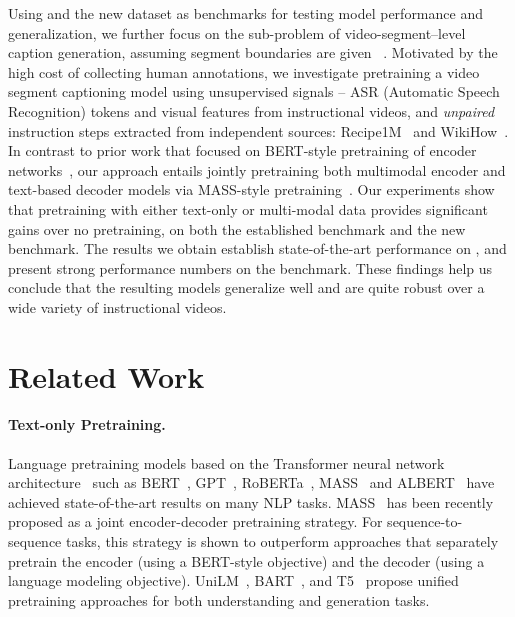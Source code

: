 \documentclass[11pt,a4paper]{article}
\begin{document}
Using \youcook and the new \ldvm dataset as benchmarks for testing model performance and generalization, we further focus on the sub-problem of video-segment--level caption generation, assuming segment boundaries are given ~\cite{hessel2019case,sun2019videobert,luo2020univilm}.
Motivated by the high cost of collecting human annotations, we investigate pretraining a video segment captioning model using unsupervised signals -- ASR (Automatic Speech Recognition) tokens and visual features from instructional videos, and {\em unpaired} instruction steps extracted from independent sources: Recipe1M~\cite{marin2019recipe1m+} and WikiHow~\cite{koupaee2018wikihow}.
In contrast to prior work that focused on BERT-style pretraining of encoder networks~\citep{sun2019videobert, sun2019contrastive},
our approach entails jointly pretraining both multimodal encoder and text-based decoder models via MASS-style pretraining~\cite{song2019mass}.
Our experiments show that pretraining with either text-only or multi-modal data provides significant gains over no pretraining, on both the established \youcook benchmark and the new \ldvm benchmark.
The results we obtain establish state-of-the-art performance on \youcook, and present strong performance numbers on the \ldvm benchmark.
These findings help us conclude that the resulting models generalize well and are quite robust over a wide variety of instructional videos.













\section{Related Work}
\label{sec:relwork}



\paragraph{Text-only Pretraining.} 
Language pretraining models based on the Transformer neural network architecture~\cite{Vaswani2017AttentionIA} such as  BERT~\citep{devlin2018bert}, GPT~\cite{GPT2018}, RoBERTa~\cite{Roberta},
MASS~\cite{song2019mass}
and ALBERT~\cite{Lan2020ALBERTAL} have achieved state-of-the-art results on many NLP tasks.
MASS~\citep{song2019mass} has been recently proposed as a joint encoder-decoder pretraining strategy. For sequence-to-sequence tasks, this strategy is shown to outperform approaches that separately pretrain the encoder (using a BERT-style objective) and the decoder (using a language modeling objective). 
UniLM~\cite{UniLM}, BART~\cite{Lewis2019BARTDS}, and T5~\cite{Raffel2019ExploringTL} propose unified pretraining approaches for both understanding and generation tasks.
\end{document}
